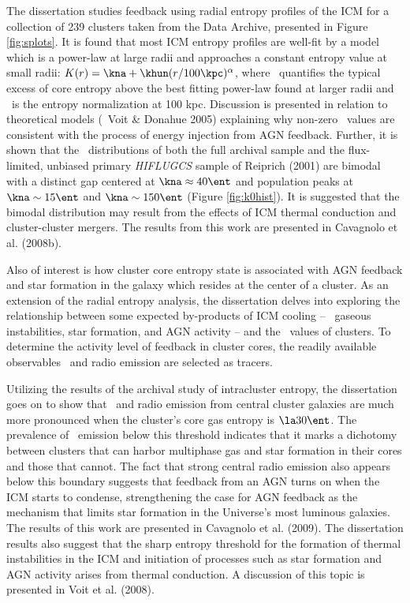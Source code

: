 \documentclass[12pt]{cv}
\begin{document}
The dissertation studies feedback using radial entropy profiles of the
ICM for a collection of 239 clusters taken from the \chandra Data
Archive, presented in Figure \ref{fig:splots}. It is found that most
ICM entropy profiles are well-fit by a model which is a power-law at
large radii and approaches a constant entropy value at small radii:
$K(r) = \kna + \khun (r/100 \kpc)^{\alpha}$, where \kna\ quantifies
the typical excess of core entropy above the best fitting power-law
found at larger radii and \khun\ is the entropy normalization at 100
kpc. Discussion is presented in relation to theoretical models
(\eg\ Voit \& Donahue 2005) explaining why non-zero \kna\ values are
consistent with the process of energy injection from AGN
feedback. Further, it is shown that the \kna\ distributions of both
the full archival sample and the flux-limited, unbiased primary
{\it{HIFLUGCS}} sample of Reiprich (2001) are bimodal with a distinct
gap centered at $\kna \approx 40 \ent$ and population peaks at $\kna
\sim 15 \ent$ and $\kna \sim 150 \ent$ (Figure \ref{fig:k0hist}). It
is suggested that the bimodal distribution may result from the effects
of ICM thermal conduction and cluster-cluster mergers. The results
from this work are presented in Cavagnolo et al. (2008b).

Also of interest is how cluster core entropy state is associated with
AGN feedback and star formation in the galaxy which resides at the
center of a cluster. As an extension of the radial entropy analysis,
the dissertation delves into exploring the relationship between some
expected by-products of ICM cooling -- \eg\ gaseous instabilities,
star formation, and AGN activity -- and the \kna\ values of
clusters. To determine the activity level of feedback in cluster
cores, the readily available observables \halpha\ and radio emission
are selected as tracers.

Utilizing the results of the archival study of intracluster entropy,
the dissertation goes on to show that \halpha\ and radio emission from
central cluster galaxies are much more pronounced when the cluster's
core gas entropy is $\la 30 \ent$. The prevalence of \halpha\ emission
below this threshold indicates that it marks a dichotomy between
clusters that can harbor multiphase gas and star formation in their
cores and those that cannot. The fact that strong central radio
emission also appears below this boundary suggests that feedback from
an AGN turns on when the ICM starts to condense, strengthening the
case for AGN feedback as the mechanism that limits star formation in
the Universe's most luminous galaxies. The results of this work are
presented in Cavagnolo et al. (2009). The dissertation results also
suggest that the sharp entropy threshold for the formation of thermal
instabilities in the ICM and initiation of processes such as star
formation and AGN activity arises from thermal conduction. A
discussion of this topic is presented in Voit et al. (2008).
\end{document}

